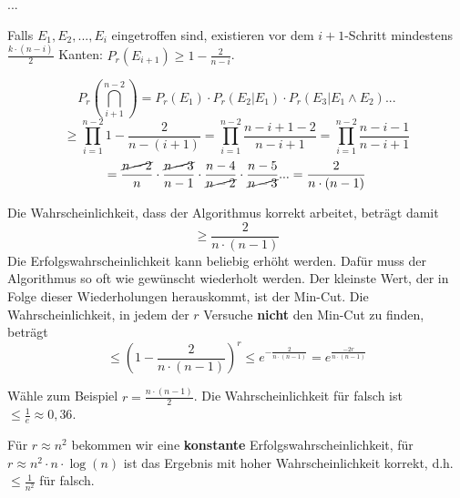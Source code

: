 \documentclass{scrartcl}%
\begin{document}
    ...

    Falls $E_1, E_2, ..., E_i$ eingetroffen sind, existieren vor dem $i+1$-Schritt mindestens $\frac{k \cdot (n-i)}{2}$ Kanten:
    $P_r(E_{i+1})  \geq 1 - \frac{2}{n-i}$.
    \newpage

    \begin{equation*}
        P_r(\bigcap_{i+1}^{n-2}) = P_r(E_1) \cdot P_r(E_2|E_1) \cdot P_r(E_3| E_1 \land E_2) ...
    \end{equation*}
    \begin{equation*}
        \geq \prod_{i=1}^{n-2}1-\frac{2}{n - (i+1)} = \prod_{i=1}^{n-2}\frac{n-i+1-2}{n-i+1} = \prod_{i=1}^{n-2}\frac{n-i-1}{n-i+1}
    \end{equation*}
    \begin{equation*}
        = \frac{\cancel{n-2}}{n} \cdot \frac{\cancel{n-3}}{n-1} \cdot \frac{n-4}{\cancel{n-2}} \cdot \frac{n-5}{\cancel{n-3}} ... = \frac{2}{n \cdot (n-1)}
    \end{equation*}

    Die Wahrscheinlichkeit, dass der Algorithmus korrekt arbeitet, beträgt damit
    \begin{equation*}
        \geq \frac{2}{n \cdot (n-1)}
    \end{equation*}
    Die Erfolgswahrscheinlichkeit kann beliebig erhöht werden.
    Dafür muss der Algorithmus so oft wie gewünscht wiederholt werden.
    Der kleinste Wert, der in Folge dieser Wiederholungen herauskommt, ist der Min-Cut.
    Die Wahrscheinlichkeit, in jedem der $r$ Versuche \textbf{nicht}
    den Min-Cut zu finden, beträgt
    \begin{equation*}
        \leq (1 - \frac{2}{n \cdot (n-1)})^r \leq e^{-\frac{2}{n \cdot (n-1)}} = e^{\frac{-2r}{n \cdot (n-1)}}
    \end{equation*}

    Wähle zum Beispiel $r = \frac{n \cdot (n-1)}{2}$.
    Die Wahrscheinlichkeit für falsch ist $\leq \frac{1}{e} \approx 0,36$.

    Für $r \approx n^2$ bekommen wir eine \textbf{konstante} Erfolgswahrscheinlichkeit,
    für $r \approx n^2 \cdot n \cdot \log(n)$ ist das Ergebnis mit hoher Wahrscheinlichkeit korrekt, d.h. $\leq \frac{1}{n^2}$ für falsch.
\end{document}

